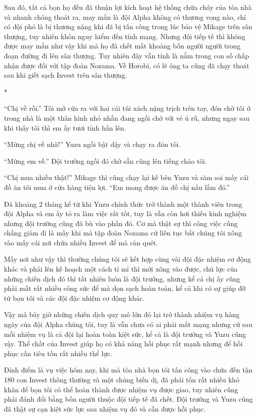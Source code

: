{Sau đó, tất cả bọn họ đều đã thuận lợi kích hoạt hệ thống chữa cháy của
tòa nhà và nhanh chóng thoát ra, may mắn là đội Alpha không có thương
vong nào, chỉ có đội phó là bị thương nặng khi đã bị tấn công trong lúc
bảo vệ Mikage trên sân thượng, tuy nhiên khôn nguy hiểm đến tính mạng.
Nhưng đội tiếp tế thì không được may mắn như vậy khi mà họ đã chết mất
khoảng bốn người người trong đoạn đường đi lên sân thượng. Tuy nhiên đây
vẫn tính là nằm trong con số chấp nhận được đối với tập đoàn Nozama. Về
Horobi, có lẽ ông ta cũng đã chạy thoát sau khi giết sạch Invest trên
sân thượng.

*

``Chị về rồi.'' Tôi mở cửa ra với hai cái túi xách nặng trịch trên tay,
đón chờ tôi ở trong nhà là một thân hình nhỏ nhắn đang ngồi chờ với vẻ ủ
rũ, nhưng ngay sau khi thấy tôi thì em ấy tươi tỉnh hẳn lên.

``Mừng chị về nhà!'' Yuzu ngồi bật dậy và chạy ra đón tôi.

``Mừng em về.'' Đội trưởng ngồi đó chờ sẵn cũng lên tiếng chào tôi.

``Chị mua nhiều thật!'' Mikage thì cũng chạy lại kế bên Yuzu và săm soi
mấy cái đồ ăn tôi mua ở cửa hàng tiện lợi. ``Em mong được ăn đồ chị nấu
lắm đó.''

Đã khoảng 2 tháng kể từ khi Yuzu chính thức trở thành một thành viên
trong đội Alpha và em ấy tỏ ra làm việc rất tốt, tuy là vẫn còn hơi
thiếu kinh nghiệm nhưng đội trưởng cũng đã bù vào phần đó. Cơ mà thật sự
thì công việc cũng chẳng giảm đi là mấy khi mà tập đoàn Nozama cứ liên
tục bắt chúng tôi xông vào mấy cái nơi chứa nhiều Invest để mà càn quét.

Mấy nơi như vậy thì thường chúng tôi sẽ kết hợp cùng vài đội đặc nhiệm
cơ động khác và phải lên kế hoạch một cách tỉ mỉ thì mới xông vào được,
chủ lực của những chiến dịch đó thì tất nhiên luôn là đội trưởng, nhưng
kể cả chị ấy cũng phải mất rất nhiều công sức để mà dọn sạch hoàn toàn,
kể cả khi có sự giúp đỡ từ bọn tôi và các đội đặc nhiệm cơ động khác.

Vậy mà bây giờ những chiến dịch quy mô lớn đó lại trở thành nhiệm vụ
hàng ngày của đội Alpha chúng tôi, tuy là vẫn chưa có ai phải mất mạng
nhưng cứ sau mỗi nhiệm vụ là cả đội lại hoàn toàn kiệt sức, kể cả là đội
trưởng và Yuzu cũng vậy. Thể chất của Invest giúp họ có khả năng hồi
phục rất mạnh nhưng để hồi phục cần tiêu tốn rất nhiều thể lực.

Đỉnh điểm là vụ việc hôm nay, khi mà tòa nhà bọn tôi tấn công vào chứa
đến tận 180 con Invest thông thường và một chủng biến dị, đã phải tốn
rất nhiều khó khăn để bọn tôi có thể hoàn thành được nhiệm vụ được giao,
tuy nhiên cũng phải đánh đổi bằng bốn người thuộc đội tiếp tế đã chết.
Đội trưởng và Yuzu cũng đã thật sự cạn kiệt sức lực sau nhiệm vụ đó và
cần được hồi phục.

}
